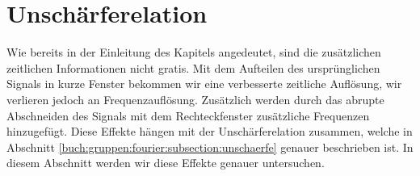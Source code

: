 %
%
%
%
\section{Unschärferelation
\label{sonogramm:section:teil1}}
Wie bereits in der Einleitung des Kapitels angedeutet, sind die zusätzlichen
zeitlichen Informationen nicht gratis. 
Mit dem Aufteilen des ursprünglichen Signals in kurze Fenster bekommen wir eine
verbesserte zeitliche Auflösung, wir verlieren jedoch an Frequenzauflösung.
Zusätzlich werden durch das abrupte Abschneiden des Signals mit dem Rechteckfenster
zusätzliche Frequenzen hinzugefügt. 
Diese Effekte hängen mit der Unschärferelation zusammen, welche in Abschnitt
\ref{buch:gruppen:fourier:subsection:unschaerfe} genauer beschrieben ist.
In diesem Abschnitt werden wir diese Effekte genauer untersuchen.
